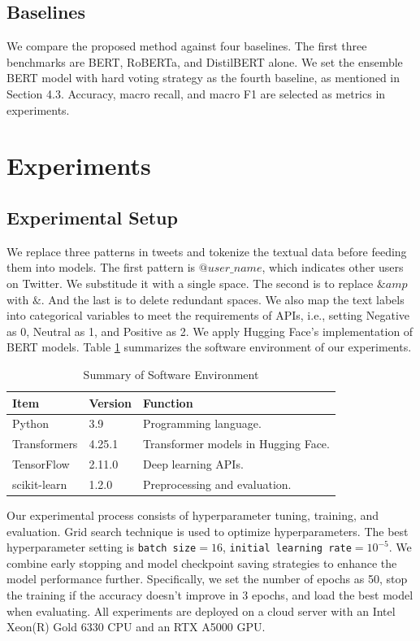 \documentclass[runningheads]{llncs}
\begin{document}
\subsection{Baselines}
We compare the proposed method against four baselines. The first three benchmarks are BERT, RoBERTa, and DistilBERT alone. We set the ensemble BERT model with hard voting strategy as the fourth baseline, as mentioned in Section 4.3. Accuracy, macro recall, and macro F1 are selected as metrics in experiments.

\section{Experiments}
\subsection{Experimental Setup}
We replace three patterns in tweets and tokenize the textual data before feeding them into models. The first pattern is $@user\_name$, which indicates other users on Twitter. We substitude it with a single space. The second is to replace $\&amp$ with $\&$. And the last is to delete redundant spaces. We also map the text labels into categorical variables to meet the requirements of APIs, i.e., setting Negative as 0, Neutral as 1, and Positive as 2. We apply Hugging Face's implementation of BERT models. Table \ref{tab:exp-software} summarizes the software environment of our experiments. 

\begin{table}[!ht]
    \centering
    \caption{Summary of Software Environment}
    \label{tab:exp-software}
    \begin{tabular}{lll}
        \toprule
        \textbf{Item} & \textbf{Version} & \textbf{Function}\\
        \midrule
        Python & 3.9 & Programming language.\\
        Transformers & 4.25.1 & Transformer models in Hugging Face.\\
        TensorFlow & 2.11.0 & Deep learning APIs.\\
        scikit-learn & 1.2.0 & Preprocessing and evaluation.\\
        \bottomrule
    \end{tabular}
\end{table}

Our experimental process consists of hyperparameter tuning, training, and evaluation. Grid search technique is used to optimize hyperparameters. The best hyperparameter setting is \texttt{batch size}$= 16$, \texttt{initial learning rate}$ = 10^{-5}$. We combine early stopping and model checkpoint saving strategies to enhance the model performance further. Specifically, we set the number of epochs as 50, stop the training if the accuracy doesn't improve in 3 epochs, and load the best model when evaluating. All experiments are deployed on a cloud server with an Intel Xeon(R) Gold 6330 CPU and an RTX A5000 GPU.
\end{document}
